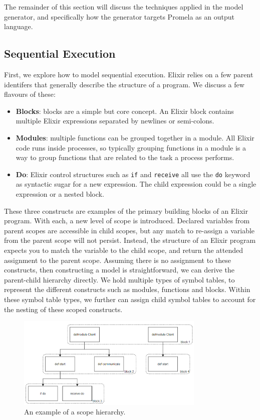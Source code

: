 The remainder of this section will discuss the techniques applied in the model generator, and specifically how the generator targets Promela as an output language.
\subsection{Sequential Execution} \label{sec:sequential_execution}
First, we explore how to model sequential execution. Elixir relies on a few parent identifers that generally describe the structure of a program. We discuss a few flavours of these:
\begin{itemize}
    \item \textbf{Blocks}: blocks are a simple but core concept. An Elixir block contains multiple Elixir expressions separated by newlines or semi-colons.
    \item \textbf{Modules}: multiple functions can be grouped together in a module. All Elixir code runs inside processes, so typically grouping functions in a module is a way to group functions that are related to the task a process performs.
    \item \textbf{Do}: Elixir control structures such as \texttt{if} and \texttt{receive} all use the \texttt{do} keyword as syntactic sugar for a new expression. The child expression could be a single expression or a nested block.
\end{itemize}
These three constructs are examples of the primary building blocks of an Elixir program. With each, a new level of scope is introduced. Declared variables from parent scopes are accessible in child scopes, but any match to re-assign a variable from the parent scope will not persist. Instead, the structure of an Elixir program expects you to match the variable to the child scope, and return the attended assignment to the parent scope. Assuming there is no assignment to these constructs, then constructing a model is straightforward, we can derive the parent-child hierarchy directly. We hold multiple types of symbol tables, to represent the different constructs such as modules, functions and blocks. Within these symbol table types, we further can assign child symbol tables to account for the nesting of these scoped constructs.
\par
\begin{figure}[h]
    \centering
    \includegraphics[width=0.8\textwidth]{images/sym_Table.png}
    \caption{An example of a scope hierarchy.}
    \label{fig:scope_hierarchy}
\end{figure}
\par

